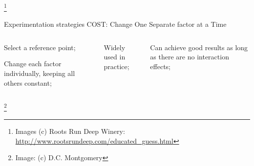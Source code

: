 \documentclass[t]{beamer}
\begin{document}
\begin{ftst}
\begin{columns}[T]
\end{columns}
\let\thefootnote\relax\footnote{\tiny Images (c) Roots Run Deep Winery: \url{http://www.rootsrundeep.com/educated_guess.html}}
\end{ftst}


\begin{ftst}
{Experimentation strategies}
{COST: Change One Separate factor at a Time}
\begin{columns}[T]
	\begin{block}{}
		\bitems Select a reference point;
			\item Change each factor individually, keeping all others constant;
		\eitem
	\end{block}
	\vone
	\bitems Widely used in practice;
		\item Can achieve good results as long as there are no interaction effects;
	\eitem
\end{columns}
\let\thefootnote\relax\footnote{\tiny Image: (c) D.C. Montgomery}
\end{ftst}

\end{document}
